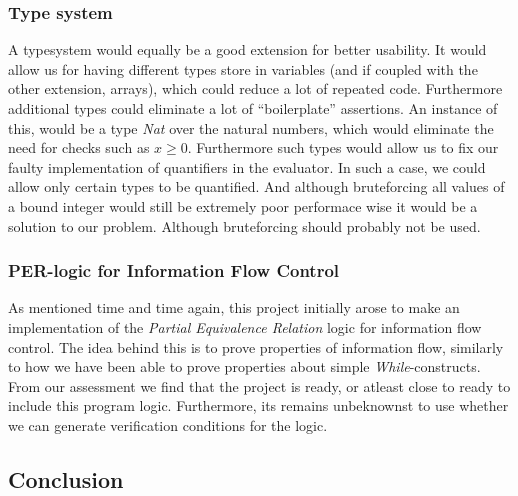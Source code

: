 \subsubsection{Type system}
A typesystem would equally be a good extension for better usability. It would allow us for having different types store in variables (and if coupled with the other extension, arrays), which could reduce a lot of repeated code. Furthermore additional types could eliminate a lot of ``boilerplate'' assertions. An instance of this, would be a type \textit{Nat} over the natural numbers, which would eliminate the need for checks such as $x \ge 0$. Furthermore such types would allow us to fix our faulty implementation of quantifiers in the evaluator. In such a case, we could allow only certain types to be quantified. And although bruteforcing all values of a bound integer would still be extremely poor performace wise it would be a solution to our problem. Although bruteforcing should probably not be used.

\subsubsection{PER-logic for Information Flow Control}
As mentioned time and time again, this project initially arose to make an implementation of the \textit{Partial Equivalence Relation} logic for information flow control\cite{}. The idea behind this is to prove properties of information flow, similarly to how we have been able to prove properties about simple \textit{While}-constructs. From our assessment we find that the project is ready, or atleast close to ready to include this program logic. Furthermore, its remains unbeknownst to use whether we can generate verification conditions for the logic.

\subsection{Conclusion}
